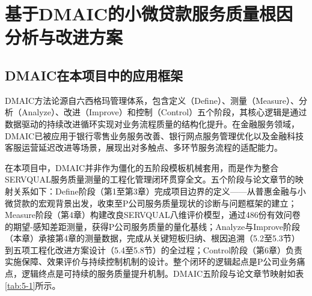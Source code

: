 \chapter{基于DMAIC的小微贷款服务质量根因分析与改进方案}

\section{DMAIC在本项目中的应用框架}

DMAIC方法论源自六西格玛管理体系，包含定义（Define）、测量（Measure）、分析（Analyze）、改进（Improve）和控制（Control）五个阶段，其核心逻辑是通过数据驱动的持续改进循环实现对业务流程质量的结构化提升\cite{ref12}。在金融服务领域，DMAIC已被应用于银行零售业务服务改善\cite{ref12}、银行网点服务管理优化\cite{ref51}以及金融科技客服运营延迟改进\cite{ref49}等场景，展现出对多触点、多环节服务流程的适配能力\cite{ref47}。\par

在本项目中，DMAIC并非作为僵化的五阶段模板机械套用，而是作为整合SERVQUAL服务质量测量的工程化管理闭环贯穿全文。五个阶段与论文章节的映射关系如下：Define阶段（第1至第3章）完成项目边界的定义——从普惠金融与小微贷款的宏观背景出发，收束至P公司服务质量现状的诊断与问题框架的建立；Measure阶段（第4章）构建改良SERVQUAL八维评价模型，通过486份有效问卷的期望-感知差距测量，获得P公司服务质量的量化基线；Analyze与Improve阶段（本章）承接第4章的测量数据，完成从关键短板归纳、根因追溯（5.2至5.3节）到五项工程化改进方案设计（5.4至5.8节）的全过程；Control阶段（第6章）负责实施保障、效果评价与持续控制机制的设计。整个闭环的逻辑起点是P公司业务痛点，逻辑终点是可持续的服务质量提升机制。DMAIC五阶段与论文章节映射如表\ref{tab:5-1}所示。\par

\begin{table}[htbp]
  \centering
  \small
  \caption{DMAIC五阶段与论文章节映射}
  \label{tab:5-1}
\end{table}

